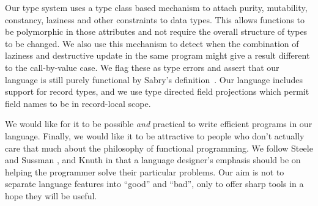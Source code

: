 Our type system uses a type class based mechanism to attach purity, mutability, constancy, laziness and other constraints to data types. This allows functions to be polymorphic in those attributes and not require the overall structure of types to be changed. We also use this mechanism to detect when the combination of laziness and destructive update in the same program might give a result different to the call-by-value case. We flag these as type errors and assert that our language is still purely functional by Sabry's definition~\cite{sabry:purely}. Our language includes support for record types, and we use type directed field projections which permit field names to be in record-local scope. 

We would like for it to be possible \emph{and} practical to write efficient programs in our language. Finally, we would like it to be attractive to people who don't actually care that much about the philosophy of functional programming. We follow Steele and Sussman \cite{steele:lambda-ultimate-imperative}, and Knuth \cite{knuth:structured-programming} in that a language designer's emphasis should be on helping the programmer solve their particular problems. Our aim is not to separate language features into ``good'' and ``bad'', only to offer sharp tools in a hope they will be useful.
